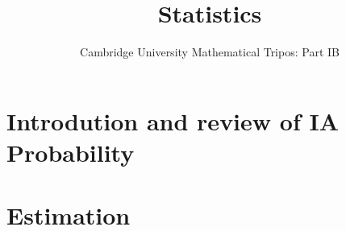 \documentclass{article}
\title{Statistics}
\author{Cambridge University Mathematical Tripos: Part IB}
\begin{document}
\maketitle

\tableofcontentsnewpage{}

\section{Introdution and review of IA Probability}

\section{Estimation}

\end{document}
